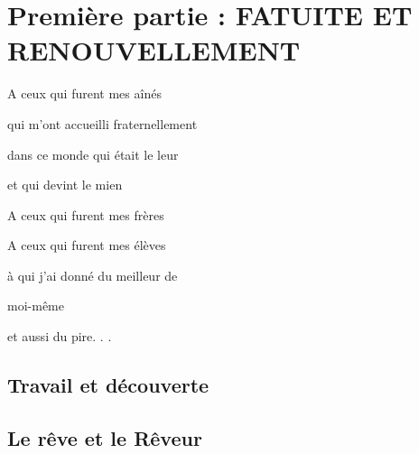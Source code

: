 \part{Première partie : FATUITE ET RENOUVELLEMENT}

\newpage

\begin{center}
    A ceux qui furent mes aînés
    
    qui m’ont accueilli fraternellement  
    
    dans ce monde qui était le leur  
    
    et qui devint le mien

    \vspace{1cm}

    A ceux qui furent mes frères
    
    A ceux qui furent mes élèves  
    
    à qui j’ai donné du meilleur de  
    
    moi-même  
    
    et aussi du pire. . .
\end{center}

\newpage

\chapter{Travail et découverte}




\chapter{Le rêve et le Rêveur}











